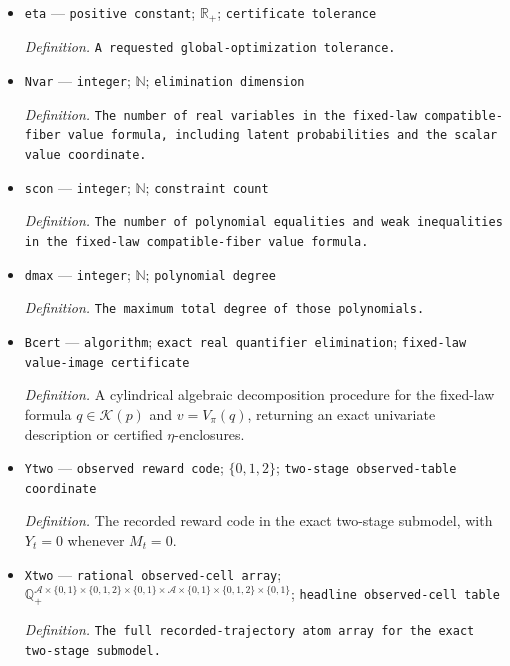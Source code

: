 \documentclass{article}
\begin{document}
\begin{itemize}
  \item \texttt{eta} --- \texttt{positive constant}; \(\mathbb R_+\); \texttt{certificate tolerance}
  \par\smallskip\noindent\emph{Definition.} \texttt{A requested global-\allowbreak{}optimization tolerance.}
  \item \texttt{Nvar} --- \texttt{integer}; \(\mathbb N\); \texttt{elimination dimension}
  \par\smallskip\noindent\emph{Definition.} \texttt{The number of real variables in the fixed-\allowbreak{}law compatible-\allowbreak{}fiber value formula,\allowbreak{} including latent probabilities and the scalar value coordinate.}
  \item \texttt{scon} --- \texttt{integer}; \(\mathbb N\); \texttt{constraint count}
  \par\smallskip\noindent\emph{Definition.} \texttt{The number of polynomial equalities and weak inequalities in the fixed-\allowbreak{}law compatible-\allowbreak{}fiber value formula.}
  \item \texttt{dmax} --- \texttt{integer}; \(\mathbb N\); \texttt{polynomial degree}
  \par\smallskip\noindent\emph{Definition.} \texttt{The maximum total degree of those polynomials.}
  \item \texttt{Bcert} --- \texttt{algorithm}; \texttt{exact real quantifier elimination}; \texttt{fixed-\allowbreak{}law value-\allowbreak{}image certificate}
  \par\smallskip\noindent\emph{Definition.} A cylindrical algebraic decomposition procedure for the fixed-law formula \(q\in\mathcal K(p)\) and \(v=V_\pi(q)\), returning an exact univariate description or certified \(\eta\)-enclosures.
  \item \texttt{Ytwo} --- \texttt{observed reward code}; \(\{0,1,2\}\); \texttt{two-\allowbreak{}stage observed-\allowbreak{}table coordinate}
  \par\smallskip\noindent\emph{Definition.} The recorded reward code in the exact two-stage submodel, with \(Y_t=0\) whenever \(M_t=0\).
  \item \texttt{Xtwo} --- \texttt{rational observed-\allowbreak{}cell array}; \(\mathbb Q_+^{\mathcal A\times\{0,1\}\times\{0,1,2\}\times\{0,1\}\times\mathcal A\times\{0,1\}\times\{0,1,2\}\times\{0,1\}}\); \texttt{headline observed-\allowbreak{}cell table}
  \par\smallskip\noindent\emph{Definition.} \texttt{The full recorded-\allowbreak{}trajectory atom array for the exact two-\allowbreak{}stage submodel.}

\end{itemize}
\end{document}
